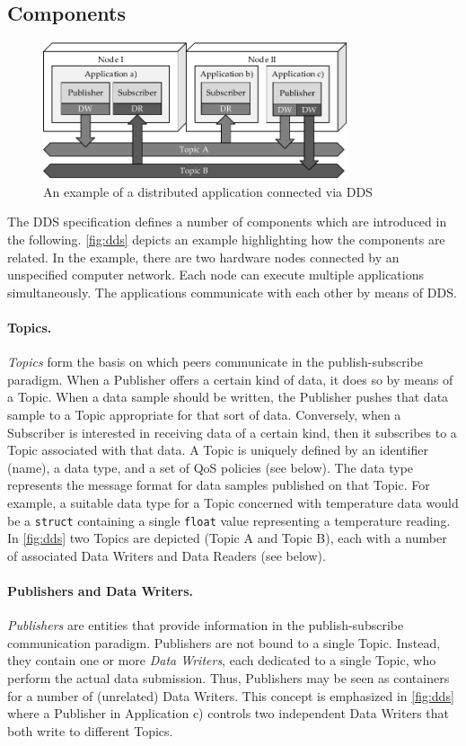 \subsection{Components}
\begin{figure}[htpb]
  \centering
  \includegraphics[width=0.8\textwidth]{figures/dds.pdf}
  \caption[An example of a distributed application connected via DDS]{An example of a distributed application connected via DDS}\label{fig:dds}
\end{figure}
The DDS specification defines a number of components which are introduced in the following. \autoref{fig:dds} depicts an example highlighting how the components are related. In the example, there are two hardware nodes connected by an unspecified computer network. Each node can execute multiple applications simultaneously. The applications communicate with each other by means of DDS. 

\paragraph{Topics.}
\emph{Topics} form the basis on which peers communicate in the publish-subscribe paradigm. When a Publisher offers a certain kind of data, it does so by means of a Topic. When a data sample should be written, the Publisher pushes that data sample to a Topic appropriate for that sort of data. Conversely, when a Subscriber is interested in receiving data of a certain kind, then it subscribes to a Topic associated with that data. A Topic is uniquely defined by an identifier (name), a data type, and a set of QoS policies (see below). The data type represents the message format for data samples published on that Topic. For example, a suitable data type for a Topic concerned with temperature data would be a \texttt{struct} containing a single \texttt{float} value representing a temperature reading.
In \autoref{fig:dds} two Topics are depicted (Topic A and Topic B), each with a number of associated Data Writers and Data Readers (see below). 

\paragraph{Publishers and Data Writers.}
\emph{Publishers} are entities that provide information in the publish-subscribe communication paradigm. Publishers are not bound to a single Topic. Instead, they contain one or more \emph{Data Writers}, each dedicated to a single Topic, who perform the actual data submission. Thus, Publishers may be seen as containers for a number of (unrelated) Data Writers. This concept is emphasized in \autoref{fig:dds} where a Publisher in Application c) controls two independent Data Writers that both write to different Topics.

